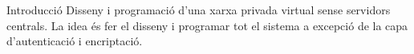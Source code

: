 \documentclass[a4paper,12pt,catalan,final]{epsc/epsc_tfc_pfc}
\begin{document}
\thispagestyle{empty}
\listoftables
\cleardoublepage

\pagestyle{fancy} 

\begin{intro}{Introducció} 
Disseny i programació d'una xarxa privada virtual sense servidors centrals. La idea és fer el disseny i programar tot el sistema a excepció de la capa d'autenticació i encriptació.
\end{intro}

\pagestyle{fancy} 






%  
%  


\pagestyle{empty}
\cleardoublepage

\end{document}
